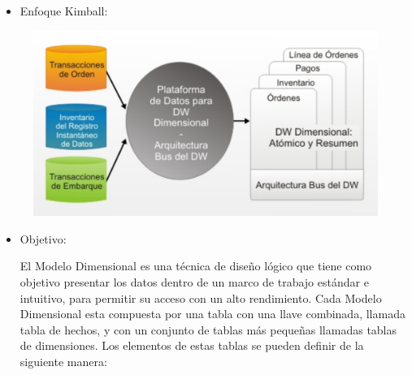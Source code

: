 \documentclass[preprint,12pt]{elsarticle}
\begin{document}
			\begin{itemize}
				\item Enfoque Kimball:
				\end{itemize}

				
			\begin{figure}[htb]
				\begin{center}
					\includegraphics[width=15cm]{./IMAGENES/kimball1}
				\end{center}
			\end{figure}
				
			\begin{itemize}

				\item Objetivo:
				
				El Modelo Dimensional es una técnica de diseño lógico que tiene como objetivo presentar los datos dentro de un marco de trabajo estándar e intuitivo, para permitir su acceso con un alto rendimiento. Cada Modelo Dimensional esta compuesta por una tabla con una llave combinada, llamada tabla de hechos, y con un conjunto de tablas más pequeñas llamadas tablas de dimensiones. Los elementos de estas tablas se pueden definir de la siguiente manera:
				
			
\end{itemize}
\end{document}
